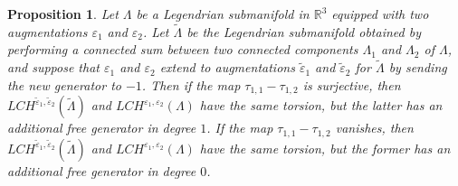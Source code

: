 \documentclass[11pt]{amsart}
\theoremstyle{plain}
\newtheorem{Prop}[defn]{Proposition}
\theoremstyle{remark}
\numberwithin{equation}{section}
\newcommand{\R}{\ensuremath{\mathbb{R}}}
\begin{document}
\begin{Prop} \label{prop:connsum}
Let $\Lambda$ be a Legendrian submanifold in $\R^3$ equipped with two augmentations $\varepsilon_1$ and $\varepsilon_2$. Let $\widetilde{\Lambda}$ be the Legendrian submanifold obtained by performing a connected sum between two connected components $\Lambda_1$ and $\Lambda_2$ of $\Lambda$, and suppose that $\varepsilon_1$ and $\varepsilon_2$ extend to augmentations 
$\widetilde{\varepsilon}_1$ and $\widetilde{\varepsilon}_2$ for $\widetilde{\Lambda}$ by sending the new generator to $-1$.
Then if the map $\tau_{1,1} - \tau_{1,2}$ is surjective, then $LCH^{\widetilde{\varepsilon}_1, \widetilde{\varepsilon}_2}(\widetilde{\Lambda})$ and
$LCH^{\varepsilon_1, \varepsilon_2}(\Lambda)$ have the same torsion, but the latter has an additional free generator in degree $1$. If the map $\tau_{1,1} - \tau_{1,2}$ vanishes, then $LCH^{\widetilde{\varepsilon}_1, \widetilde{\varepsilon}_2}(\widetilde{\Lambda})$ and
$LCH^{\varepsilon_1, \varepsilon_2}(\Lambda)$ have the same torsion, but the former has an additional free generator in degree $0$.
\end{Prop}
\end{document}
